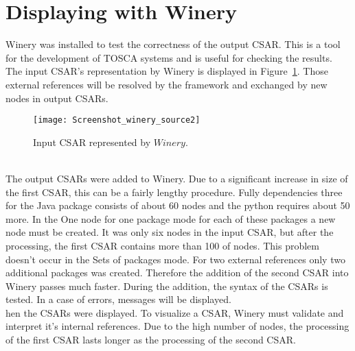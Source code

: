 \section{Displaying with Winery}\label{sec:checkwin}
Winery was installed to test the correctness of the output CSAR. 
 This is a tool for the development of TOSCA systems and is useful for checking the results. %
 The input CSAR's representation by Winery is displayed in Figure~\ref{fig:winery_source2}.
 Those external references will be resolved by the framework and exchanged by new nodes in output CSARs. 
 \begin{figure}[ht]   
 	\centering
 	\texttt{[image: Screenshot\_winery\_source2]}
 	\caption{Input CSAR represented by $Winery$.}
 	\label{fig:winery_source2}
 \end{figure}
   \\
 The output CSARs were added to Winery.
 Due to a significant increase in size of the first CSAR, this can be a fairly lengthy procedure.
Fully dependencies three for the Java package consists of about 60 nodes and the python requires about 50 more. 
In the One node for one package mode for each of these packages a new node must be created.
It was only six nodes in the input CSAR, but after the processing, the first CSAR contains more than 100 of nodes.
This problem doesn't occur in the Sets of packages mode. 
For two external references only two additional packages was created.
Therefore the addition of the second CSAR into Winery passes much faster. 
 During the addition, the syntax of the CSARs is tested.
 In a case of errors, messages will be displayed.
 \\
hen the CSARs were displayed.
To visualize a CSAR, Winery must validate and interpret it's internal references.
Due to the high number of nodes, the processing of the first CSAR lasts longer as the processing of the second CSAR. 


